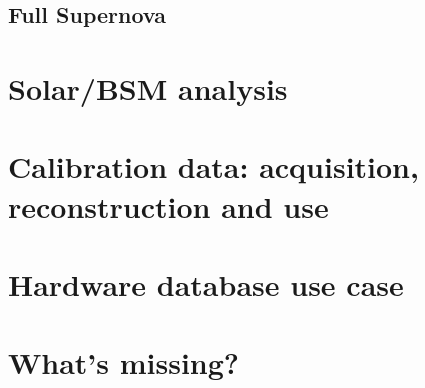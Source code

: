 \documentclass[../main-00.tex]{subfiles}
\begin{document}
\subsection{Full Supernova}

\section{Solar/BSM analysis}
\label{sec:use:BSManalysis}

\section{Calibration data: acquisition, reconstruction and use}
\label{sec:use:calib}  %

\section{Hardware database use case} 
\label{sec:use:hdb} 

\section{What's missing?}
\label{sec:use:todo}



\end{document}
